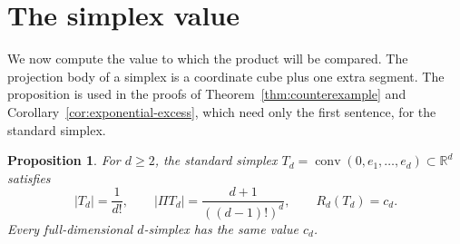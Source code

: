 \documentclass[11pt]{article}
\newtheorem{proposition}[theorem]{Proposition}
\newcommand{\R}{\mathbb R}
\DeclareMathOperator{\conv}{conv}
\begin{document}
\section{The simplex value}\label{sec:simplex}

We now compute the value to which the product will be compared. The
projection body of a simplex is a coordinate cube plus one extra segment.
The proposition is used in the proofs of Theorem~\ref{thm:counterexample}
and Corollary~\ref{cor:exponential-excess}, which need only the first
sentence, for the standard simplex.

\begin{proposition}\label{prop:simplex}
For \(d\ge2\), the standard simplex
\(T_d=\conv(0,e_1,\ldots,e_d)\subset\R^d\) satisfies
\[
 |T_d|=\frac1{d!},\qquad
 |\Pi T_d|=\frac{d+1}{((d-1)!)^d},\qquad
 R_d(T_d)=c_d.
\]
Every full-dimensional \(d\)-simplex has the same value \(c_d\).
\end{proposition}
\end{document}
